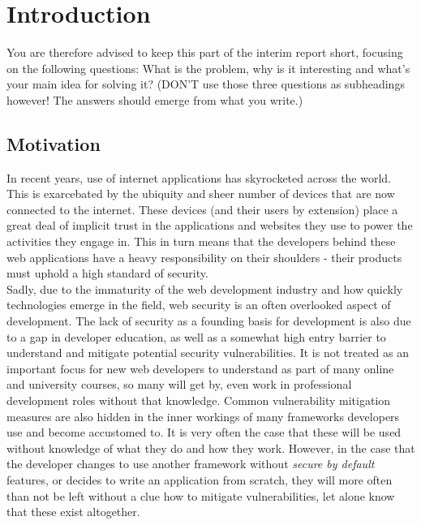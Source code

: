 \chapter{Introduction}

  You are therefore advised to keep this part of the interim report short, focusing on the following questions: What is the problem, why is it interesting and what’s your main idea for solving it?  (DON'T use those three questions as subheadings however!  The answers should emerge from what you write.)



\section{Motivation}

In recent years, use of internet applications has skyrocketed across the world. This is exarcebated by the ubiquity and sheer number of devices that are now connected to the internet. 
These devices (and their users by extension) place a great deal of implicit trust in the applications and websites they use to power the activities they engage in. 
This in turn means that the developers behind these web applications have a heavy responsibility on their shoulders - their products must uphold a high standard of security.  \\


Sadly, due to the immaturity of the web development industry and how quickly technologies emerge in the field, web security is an often overlooked aspect of development. 
The lack of security as a founding basis for development is also due to a gap in developer education, as well as a somewhat high entry barrier to understand and mitigate potential security vulnerabilities. It is not treated as an important focus for new web developers to understand as part of many online and university courses, so many will get by, even work in professional development roles without that knowledge. 
Common vulnerability mitigation measures are also hidden in the inner workings of many frameworks developers use and become accustomed to. 
It is very often the case that these will be used without knowledge of what they do and how they work. However, in the case that the developer changes to use another framework without \textit{secure by default} features, or decides to write an application from scratch, they will more often than not be left without a clue how to mitigate vulnerabilities, let alone know that these exist altogether. \\


